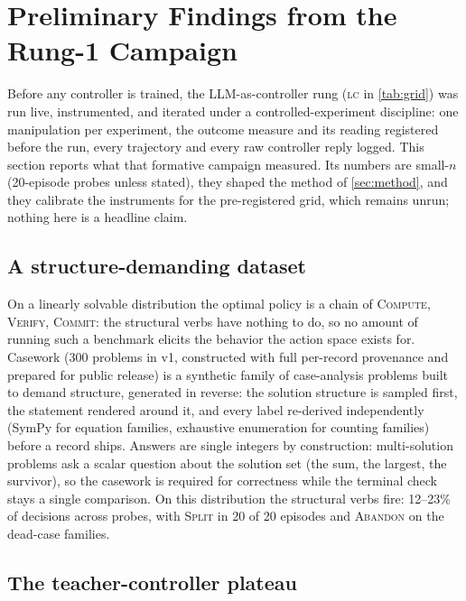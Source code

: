 \section{Preliminary Findings from the Rung-1 Campaign}
\label{sec:preliminary}

Before any controller is trained, the LLM-as-controller rung (\textsc{lc}
in \cref{tab:grid}) was run live, instrumented, and iterated under a
controlled-experiment discipline: one manipulation per experiment, the
outcome measure and its reading registered before the run, every
trajectory and every raw controller reply logged. This section reports
what that formative campaign measured. Its numbers are small-$n$
(20-episode probes unless stated), they shaped the method of
\cref{sec:method}, and they calibrate the instruments for the
pre-registered grid, which remains unrun; nothing here is a headline
claim.

\subsection{A structure-demanding dataset}
\label{sec:prelim-casework}

On a linearly solvable distribution the optimal policy is a chain of
\textsc{Compute}, \textsc{Verify}, \textsc{Commit}: the structural verbs
have nothing to do, so no amount of running such a benchmark elicits the
behavior the action space exists for. Casework (300 problems in v1,
constructed with full per-record provenance and prepared for public
release) is a synthetic family of case-analysis problems built to demand
structure, generated in reverse: the solution
structure is sampled first, the statement rendered around it, and every
label re-derived independently (SymPy for equation families, exhaustive
enumeration for counting families) before a record ships. Answers are
single integers by construction: multi-solution problems ask a scalar
question about the solution set (the sum, the largest, the survivor), so
the casework is required for correctness while the terminal check stays a
single comparison. On this distribution the structural verbs fire:
12--23\% of decisions across probes, with \textsc{Split} in 20 of 20
episodes and \textsc{Abandon} on the dead-case families.

\subsection{The teacher-controller plateau}
\label{sec:prelim-obs}


